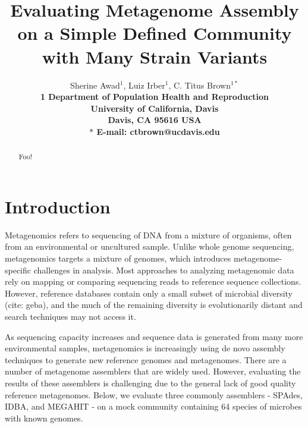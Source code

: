 \documentclass[11pt]{article}
\begin{document}
\title{Evaluating Metagenome Assembly on a Simple Defined Community with Many Strain Variants}

\author{Sherine Awad$^{1}$, Luiz Irber$^{1}$, C. Titus Brown$^{1\ast}$\\
\small
\bf{1} Department of Population Health and Reproduction \\
\small
University of California, Davis\\
\small
Davis, CA 95616 USA\\
\small
$\ast$ E-mail: ctbrown@ucdavis.edu
} 

\maketitle


\begin{abstract}
 

  Foo!
  
\end{abstract}

\clearpage

\section*{Introduction}

Metagenomics refers to sequencing of DNA from a mixture of organisms,
often from an environmental or uncultured sample. Unlike whole genome
sequencing, metagenomics targets a mixture of genomes, which
introduces metagenome-specific challenges in analysis.  Most
approaches to analyzing metagenomic data rely on mapping or comparing
sequencing reads to reference sequence collections. However, reference
databases contain only a small subset of microbial diversity (cite:
geba), and the much of the remaining diversity is evolutionarily distant
and search techniques may not access it.

As sequencing capacity increases and sequence data is generated from
many more environmental samples, metagenomics is increasingly using de
novo assembly techniques to generate new reference genomes and
metagenomes.  There are a number of metagenome assemblers that are
widely used. However, evaluating the results of these assemblers is
challenging due to the general lack of good quality reference
metagenomes.  Below, we evaluate three commonly assemblers - SPAdes,
IDBA, and MEGAHIT - on a mock community containing 64 species of
microbes with known genomes.
\end{document}
